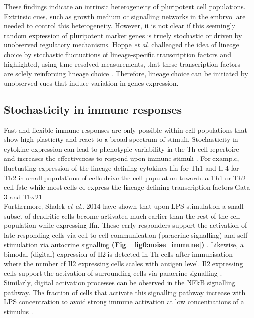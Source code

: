 These findings indicate an intrinsic heterogeneity of pluripotent cell populations. 
Extrinsic cues, such as growth medium or signalling networks in the embryo, are needed to control this heterogeneity.
However, it is not clear if this seemingly random expression of pluripotent marker genes is truely stochastic or driven by unobserved regulatory mechanisms.
Hoppe \emph{et al.} challenged the idea of lineage choice by stochastic fluctuations of lineage-specific transcription factors and highlighted, using time-resolved measurements, that these transcription factors are solely reinforcing lineage choice \cite{Hoppe2016}.
Therefore, lineage choice can be initiated by unobserved cues that induce variation in genes expression. 

\subsection{Stochasticity in immune responses}

Fast and flexible immune responses are only possible within cell populations that show high plasticity and react to a broad spectrum of stimuli. 
Stochasticity in cytokine expression can lead to phenotypic variability in the \Gls{Th} cell repertoire and increases the effectiveness to respond upon immune stimuli \citep{Schrom2017}. 
For example, fluctuating expression of the lineage defining cytokines \gls{Ifn}\textgamma{} for Th1 and \gls{Il} 4 for Th2 in small populations of cells drive the cell population towards a Th1 or Th2 cell fate while most cells co-express the lineage defining transcription factors \Gls{Gata} 3 and \Gls{Tbx21} \citep{Fang2013a, Antebi2013}.\\

Furthermore, Shalek \textit{et al.}, 2014 have shown that upon \gls{LPS} stimulation a small subset of dendritic cells become activated much earlier than the rest of the cell population while expressing \gls{Ifn}\textbeta. 
These early responders support the activation of late responding cells via cell-to-cell communication (paracrine signalling) and self-stimulation via autocrine signalling \textbf{(Fig.~\ref{fig0:noise_immune})} \citep{Shalek2014}. 
Likewise, a bimodal (digital) expression of Il2 is detected in \gls{Th} cells after immunisation where the number of Il2 expressing cells scales with antigen level. 
Il2 expressing cells support the activation of surrounding cells via paracrine signalling \citep{Fuhrmann2016}. 
Similarly, digital activation processes can be observed in the \gls{NFkB} signalling pathway. 
The fraction of cells that activate this signalling pathway increase with LPS concentration to avoid strong immune activation at low concentrations of a stimulus \citep{Kellogg2015b}. 

